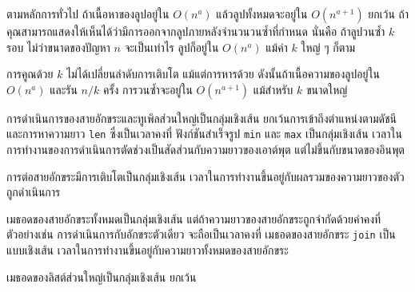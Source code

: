 ตามหลักการทั่วไป ถ้าเนื้อหาของลูปอยู่ใน {\scriptsize$O(n^a)$} แล้วลูปทั้งหมดจะอยู่ใน {\scriptsize$O(n^{a+1})$} 
ยกเว้น ถ้าคุณสามารถแสดงให้เห็นได้ว่ามีการออกจากลูปภายหลังจำนวนวนซ้ำที่กำหนด
นั่นคือ ถ้าลูปวนซ้ำ {\scriptsize$k$} รอบ ไม่ว่าขนาดของปัญหา {\scriptsize$n$} จะเป็นเท่าไร
ลูปก็อยู่ใน {\scriptsize$O(n^a)$} แม้ค่า {\scriptsize$k$} ใหญ่ ๆ ก็ตาม



การคูณด้วย {\scriptsize$k$} ไม่ได้เปลี่ยนลำดับการเติบโต แม้แต่การหารด้วย 
ดังนั้นถ้าเนื้อความของลูปอยู่ใน {\scriptsize$O(n^a)$} และรัน {\scriptsize$n/k$} ครั้ง 
การวนซ้ำจะอยู่ใน {\scriptsize$O(n^{a+1})$} แม้สำหรับ {\scriptsize$k$} ขนาดใหญ่



การดำเนินการของสายอักขระและทูเพิลส่วนใหญ่เป็นกลุ่มเชิงเส้น ยกเว้นการเข้าถึงตำแหน่งตามดัชนีและการหาความยาว {\tt  len} ซึ่งเป็นเวลาคงที่ 
ฟังก์ชันสำเร็จรูป {\tt min} และ {\tt max} เป็นกลุ่มเชิงเส้น เวลาในการทำงานของการดำเนินการตัดช่วงเป็นสัดส่วนกับความยาวของเอาต์พุต แต่ไม่ขึ้นกับขนาดของอินพุต

การต่อสายอักขระมีการเติบโตเป็นกลุ่มเชิงเส้น เวลาในการทำงานขึ้นอยู่กับผลรวมของความยาวของตัวถูกดำเนินการ


เมธอดของสายอักขระทั้งหมดเป็นกลุ่มเชิงเส้น แต่ถ้าความยาวของสายอักขระถูกจำกัดด้วยค่าคงที่ 
ตัวอย่างเช่น 
การดำเนินการกับอักขระตัวเดียว จะถือเป็นเวลาคงที่ เมธอดของสายอักขระ {\tt join} เป็นแบบเชิงเส้น 
เวลาในการทำงานขึ้นอยู่กับความยาวทั้งหมดของสายอักขระ

เมธอดของลิสต์ส่วนใหญ่เป็นกลุ่มเชิงเส้น ยกเว้น

